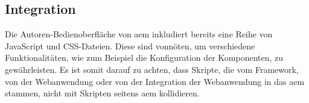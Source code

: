 \subsection{Integration}

Die Autoren-Bedienoberfläche von \ac{aem} inkludiert bereits eine Reihe von JavaScript und CSS-Dateien. Diese sind vonnöten, um verschiedene Funktionalitäten, wie zum Beispiel die Konfiguration der Komponenten, zu gewährleisten. Es ist somit darauf zu achten, dass Skripte, die vom Framework, von der Webanwendung oder von der Integration der Webanwendung in das \ac{aem} stammen, nicht mit Skripten seitens \ac{aem} kollidieren.